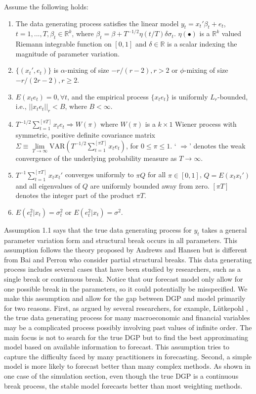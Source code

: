 \begin{Assumption}\label{asump:1}
Assume the following holds:
\begin{enumerate}
	\item The data generating process satisfies the linear model $y_t = x_t'\beta_t + e_t$, $t=1,...,T,\beta_t \in \mathbb{R}^k$, where $\beta_t = \beta + T^{-1/2}\eta(t/T)\delta\sigma_t$. $\eta(\bullet)$ is a $\mathbb{R}^k$ valued Riemann integrable function on $[0,1]$ and $\delta \in \mathbb{R}$ is a scalar indexing the magnitude of parameter variation.
	\item $\{(x_t',e_t)\}$ is $\alpha$-mixing of size $-r/(r-2),r > 2$ or $\phi$-mixing of size $-r/(2r-2),r \geq 2$.
    \item $E(x_t e_t) = 0, \forall t$, and the empirical process $\{x_t e_t\}$ is uniformly $L_r$-bounded, i.e., $||x_t e_t||_{r} < B$, where $B < \infty$.
    \item $T^{-1/2}\sum_{t=1}^{[\pi T]} x_t e_t \Rightarrow W(\pi)$ where $W(\pi)$ is a $k \times 1$ Wiener process with symmetric, positive definite covariance matrix $\Sigma \equiv \lim\limits_{T\to \infty}\mathrm{VAR}(T^{-1/2}\sum_{t=1}^{[\pi T]} x_t e_t)$, for $0 \leq \pi \leq 1$. ` $\Rightarrow$' denotes the weak convergence of the underlying probability measure as $T \to \infty$.
	\item $T^{-1}\sum_{t=1}^{[\pi T]}x_t x_t'$ converges uniformly to $\pi Q$ for all $\pi \in [0,1]$, $Q = E(x_t x_t')$ and all eigenvalues of $Q$ are uniformly bounded away from zero. $[\pi T]$ denotes the integer part of the product $\pi T$.
	\item $E(e_t^{2}|x_t) = \sigma_t^{2}$ or $E(e_t^{2}|x_t) = \sigma^{2}$.
\end{enumerate}
\end{Assumption}
Assumption 1.1 says that the true data generating process for $y_t$ takes a general parameter variation form and structural break occurs in all parameters. This assumption follows the theory proposed by Andrews and Hansen but is different from Bai and Perron who consider partial structural breaks. This data generating process includes several cases that have been studied by researchers, such as a single break or continuous break. Notice that our forecast model only allow for one possible break in the parameters, so it could potentially be misspecified. We make this assumption and allow for the gap between DGP and model primarily for two reasons. First, as argued by several researchers, for example, L\"{u}tkepohl \cite{lutkepohl_textbook}, the true data generating process for many macroeconomic and financial variables may be a complicated process possibly involving past values of infinite order. The main focus is not to search for the true DGP but to find the best approximating model based on available information to forecast. This assumption tries to capture the difficulty faced by many practitioners in forecasting. Second, a simple model is more likely to forecast better than many complex methods. As shown in one case of the simulation section, even though the true DGP is a continuous break process, the stable model forecasts better than most weighting methods.

